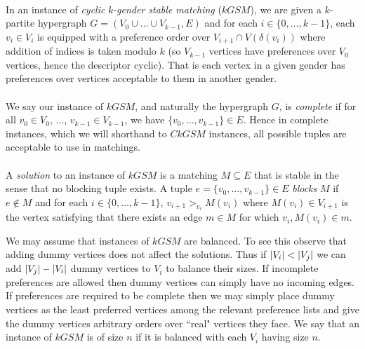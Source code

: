 \paragraph{} In an instance of {\it cyclic} $k$-{\it gender stable matching} ($kGSM$), we are given a $k$-partite hypergraph $G=(V_0 \cup \dots \cup V_{k-1}, E)$ and for each $i \in \{0,\dots,k-1\}$, each $v_i \in V_i$ is equipped with a preference order over $V_{i+1} \cap V(\delta(v_i))$ where addition of indices is taken modulo $k$ (so $V_{k-1}$ vertices have preferences over $V_0$ vertices, hence the descriptor cyclic). That is each vertex in a given gender has preferences over vertices acceptable to them in another gender.

\paragraph{}We say our instance of $kGSM$, and naturally the hypergraph $G$, is {\it complete} if for all $v_0 \in V_0$, $\dots$, $v_{k-1} \in V_{k-1}$, we have $\{v_0,\dots,v_{k-1}\} \in E$. Hence in complete instances, which we will shorthand to $CkGSM$ instances, all possible tuples are acceptable to use in matchings.

\paragraph{}A {\it solution} to an instance of $kGSM$ is a matching $M \subseteq E$ that is stable in the sense that no blocking tuple exists. A tuple $e=\{v_0,\dots, v_{k-1}\} \in E$ {\it blocks} $M$ if $e\not\in M$ and for each $i \in \{0,\dots, k-1\}$, $v_{i+1} >_{v_i} M(v_i)$ where $M(v_i) \in V_{i+1}$ is the vertex satisfying that there exists an edge $m \in M$ for which $v_i, M(v_i) \in m$.

\begin{note}
We may assume that instances of $kGSM$ are balanced. To see this observe that adding dummy vertices does not affect the solutions. Thus if $\left|V_i\right| < \left|V_j\right|$ we can add $\left|V_j\right| - \left|V_i\right|$ dummy vertices to $V_i$ to balance their sizes. If incomplete preferences are allowed then dummy vertices can simply have no incoming edges. If preferences are required to be complete then we may simply place dummy vertices as the least preferred vertices among the relevant preference lists and give the dummy vertices arbitrary orders over ``real" vertices they face. We say that an instance of $kGSM$ is of size $n$ if it is balanced with each $V_i$ having size $n$.
\end{note}
